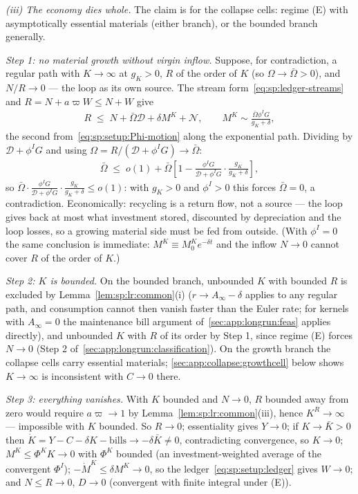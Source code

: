 \emph{(iii) The economy dies whole.} The claim is for the collapse cells: regime (E) with
asymptotically essential materials (either branch), or the bounded branch generally.

\emph{Step 1: no material growth without virgin inflow.} Suppose, for contradiction, a
regular path with $K\to\infty$ at $g_K>0$, $R$ of the order of $K$ (so $\Omega\to\bar\Omega>0$),
and $N/R\to0$ --- the loop as its own source. The stream form~\eqref{eq:sp:ledger-streams}
and $R=N+a\varpi W\le N+W$ give
\begin{align}
R\;\le\;N+\bar\Omega\mathcal D+\delta M^K+\mathcal N,
\qquad
M^K\sim\frac{\bar\Omega\phi^IG}{g_K+\delta} ,
\label{eq:app:col:massbalance}
\end{align}
the second from~\eqref{eq:sp:setup:Phi-motion} along the exponential path. Dividing by
$\mathcal D+\phi^IG$ and using $\Omega=R/\left(\mathcal D+\phi^IG\right)\to\bar\Omega$:
\begin{align}
\bar\Omega\;\le\;o\!\left(1\right)+\bar\Omega\left[1-\frac{\phi^IG}{\mathcal D+\phi^IG}\cdot
\frac{g_K}{g_K+\delta}\right],
\label{eq:app:col:massbalance2}
\end{align}
so $\bar\Omega\cdot\frac{\phi^IG}{\mathcal D+\phi^IG}\cdot\frac{g_K}{g_K+\delta}\le o(1)$:
with $g_K>0$ and $\phi^I>0$ this forces $\bar\Omega=0$, a contradiction. Economically:
recycling is a return flow, not a source --- the loop gives back at most what investment
stored, discounted by depreciation and the loop losses, so a growing material side must be
fed from outside. (With $\phi^I=0$ the same conclusion is immediate: $M^K\equiv M^K_0e^{-\delta t}$
and the inflow $N\to0$ cannot cover $R$ of the order of $K$.)

\emph{Step 2: $K$ is bounded.} On the bounded branch, unbounded $K$ with bounded $R$ is
excluded by Lemma~\ref{lem:sp:lr:common}(i) ($r\to A_\infty-\delta$ applies to any regular
path, and consumption cannot then vanish faster than the Euler rate; for kernels with
$A_\infty=0$ the maintenance bill argument of~\ref{sec:app:longrun:feas} applies directly),
and unbounded $K$ with $R$ of its order by Step 1, since regime (E) forces $N\to0$
(Step 2 of~\ref{sec:app:longrun:classification}). On the growth branch the collapse cells
carry essential materials; \ref{sec:app:collapse:growthcell} below shows $K\to\infty$ is
inconsistent with $C\to0$ there.

\emph{Step 3: everything vanishes.} With $K$ bounded and $N\to0$, $R$ bounded away from zero
would require $a\varpi\to1$ by Lemma~\ref{lem:sp:lr:common}(iii), hence $K^R\to\infty$ ---
impossible with $K$ bounded. So $R\to0$; essentiality gives $Y\to0$; if $K\to\bar K>0$ then
$\dot K=Y-C-\delta K-\text{bills}\to-\delta\bar K\ne0$, contradicting convergence, so
$K\to0$; $M^K\le\Phi^KK\to0$ with $\Phi^K$ bounded (an investment-weighted average of the
convergent $\Phi^I$); $-\dot M^K\le\delta M^K\to0$, so the
ledger~\eqref{eq:sp:setup:ledger} gives $W\to0$; and $N\le R\to0$, $D\to0$ (convergent with
finite integral under (E)).

